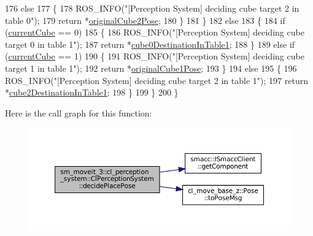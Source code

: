 \begin{DoxyCode}
176             \textcolor{keywordflow}{else}
177             \{
178                 ROS\_INFO(\textcolor{stringliteral}{"[Perception System] deciding cube target 2 in table 0"});
179                 \textcolor{keywordflow}{return} *\hyperlink{classsm__moveit__3_1_1cl__perception__system_1_1ClPerceptionSystem_a71df0282435faa5f108c4fb2d846e90f}{originalCube2Pose};
180             \}
181         \}
182         \textcolor{keywordflow}{else}
183         \{
184             \textcolor{keywordflow}{if} (\hyperlink{classsm__moveit__3_1_1cl__perception__system_1_1ClPerceptionSystem_ad915fc687481d4157ec40de52f8eaa82}{currentCube} == 0)
185             \{
186                 ROS\_INFO(\textcolor{stringliteral}{"[Perception System] deciding cube target 0 in table 1"});
187                 \textcolor{keywordflow}{return} *\hyperlink{classsm__moveit__3_1_1cl__perception__system_1_1ClPerceptionSystem_a56f5be6a474c2825b99cab724d2099a1}{cube0DestinationInTable1};
188             \}
189             \textcolor{keywordflow}{else} \textcolor{keywordflow}{if} (\hyperlink{classsm__moveit__3_1_1cl__perception__system_1_1ClPerceptionSystem_ad915fc687481d4157ec40de52f8eaa82}{currentCube} == 1)
190             \{
191                 ROS\_INFO(\textcolor{stringliteral}{"[Perception System] deciding cube target 1 in table 1"});
192                 \textcolor{keywordflow}{return} *\hyperlink{classsm__moveit__3_1_1cl__perception__system_1_1ClPerceptionSystem_aaf71c0201292be01979762e7f893878d}{originalCube1Pose};
193             \}
194             \textcolor{keywordflow}{else}
195             \{
196                 ROS\_INFO(\textcolor{stringliteral}{"[Perception System] deciding cube target 2 in table 1"});
197                 \textcolor{keywordflow}{return} *\hyperlink{classsm__moveit__3_1_1cl__perception__system_1_1ClPerceptionSystem_a1aae7fcf13de6c6b6c07dd2b595a5538}{cube2DestinationInTable1};
198             \}
199         \}
200     \}
\end{DoxyCode}
Here is the call graph for this function\+:
\nopagebreak
\begin{figure}[H]
\begin{center}
\leavevmode
\includegraphics[width=350pt]{classsm__moveit__3_1_1cl__perception__system_1_1ClPerceptionSystem_a0ee47269c0aacdced77b9bbe9577499d_cgraph}
\end{center}
\end{figure}
